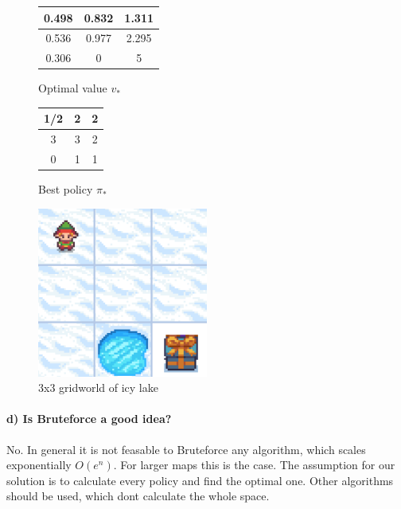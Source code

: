 \documentclass{article}
\begin{document}
\begin{figure}[H]
\begin{minipage}{0.45\textwidth}
    \centering
    \begin{tabular}{c|c|c}
    0.498 & 0.832 & 1.311 \\ \hline
    0.536 & 0.977 & 2.295 \\ \hline                 
    0.306 & 0 & 5 \\
    \end{tabular}
    \caption{Optimal value $v_*$}
    \label{tab:table3}
\end{minipage}
\begin{minipage}{0.45\textwidth}
    \centering
    \begin{tabular}{c|c|c}
     1/2 & 2 & 2 \\ \hline
     3 & 3 & 2 \\ \hline
     0 & 1 & 1
    \end{tabular}
    \caption{Best policy $\pi_*$}
    \label{tab:bestPol}
\end{minipage}    
\end{figure}



\begin{figure}[H]
\centering
\includegraphics[width=0.5\textwidth]{IceIceBaby.png}
\caption{3x3 gridworld of icy lake}
\label{fig:ice}
\end{figure}


\paragraph*{d) Is Bruteforce a good idea?}

No. In general it is not feasable to Bruteforce any algorithm, which scales exponentially $O(e^n)$. For larger maps this is the case. The assumption for our solution is to calculate every policy and find the optimal one. Other algorithms should be used, which dont calculate the whole space. 
\end{document}
